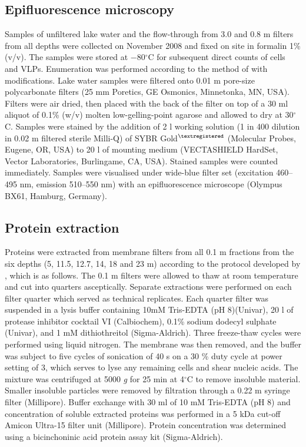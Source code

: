 \subsection{Epifluorescence microscopy}
Samples of unfiltered lake water and the flow-through from 3.0 and 0.8 \textmu{}m filters from all depths were collected on November 2008 and fixed on site in formalin 1\% (v/v). 
The samples were stored at $-$80$^{\circ}$C for subsequent direct counts of cells and \acp{VLP}. 
Enumeration was performed according to the method of \citet{Patel2007} with modifications. 
Lake water samples were filtered onto 0.01 \textmu{}m pore-size polycarbonate filters (25 mm Poretics, \textsc{GE} Osmonics, Minnetonka, \textsc{MN}, \textsc{USA}). 
Filters were air dried, then placed with the back of the filter on top of a 30 ml aliquot of 0.1\% (w/v) molten low-gelling-point agarose and allowed to dry at 30$^{\circ}$C. 
Samples were stained by the addition of 2 \textmu{}l working solution (1 in 400 dilution in 0.02 \textmu{}m filtered sterile Milli-Q) of \textsc{SYBR} Gold$^{\textregistered}$ (Molecular Probes, Eugene, \textsc{OR}, \textsc{USA}) to 20 \textmu{}l of mounting medium (\textsc{VECTASHIELD} HardSet, Vector Laboratories, Burlingame, \textsc{CA}, \textsc{USA}). 
Stained samples were counted immediately.
Samples were visualised under wide-blue filter set (excitation 460--495 nm, emission 510--550 nm) with an epifluorescence microscope (Olympus BX61, Hamburg, Germany).


\subsection{Protein extraction}
Proteins were extracted from membrane filters from all 0.1 \textmu{}m fractions from the six depths (5, 11.5, 12.7, 14, 18 and 23 m) according to the protocol developed by \citet{Ng2010a}, which is as follows.
The 0.1 \textmu{}m filters were allowed to thaw at room temperature and cut into quarters asceptically.
Separate extractions were performed on each filter quarter which served as technical replicates.
Each quarter filter was suspended in a lysis buffer containing 10mM Tris-EDTA (pH 8)(Univar), 20 \textmu{}l of protease inhibitor cocktail VI (Calbiochem), 0.1\% sodium dodecyl sulphate (Univar), and 1 mM dithiothreitol (Sigma-Aldrich).
Three freeze-thaw cycles were performed using liquid nitrogen.
The membrane was then removed, and the buffer was subject to five cycles of sonication of 40 s on a 30 \% duty cycle at power setting of 3, which serves to lyse any remaining cells and shear nucleic acids.
The mixture was centrifuged at 5000 \emph{g} for 25 min at 4$^{\circ}$C to remove insoluble material.
Smaller insoluble particles were removed by filtration through a 0.22 \textmu{}m syringe filter (Millipore).
Buffer exchange with 30 ml of 10 mM Tris-EDTA (pH 8) and concentration of soluble extracted proteins was performed in a 5 kDa cut-off Amicon Ultra-15 filter unit (Millipore).
Protein concentration was determined using a bicinchoninic acid protein assay kit (Sigma-Aldrich).

